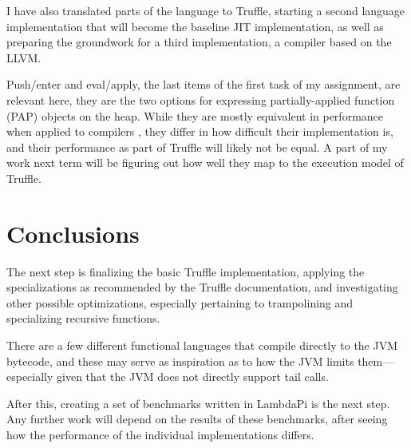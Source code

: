 \documentclass{SPFIT}
\begin{document}
I have also translated parts of the language to Truffle, starting a second
language implementation that will become the baseline JIT implementation, as
well as preparing the groundwork for a third implementation, a compiler based on
the LLVM.

Push/enter and eval/apply, the last items of the first task of my assignment,
are relevant here, they are the two options for expressing partially-applied
function (PAP) objects on the heap. While they are mostly equivalent in
performance when applied to compilers \cite{marlow2004making}, they differ in
how difficult their implementation is, and their performance as part of Truffle
will likely not be equal.  A part of my work next term will be figuring out how
well they map to the execution model of Truffle.

\section{Conclusions}
\label{sec:org57f16e4}
The next step is finalizing the basic Truffle implementation, applying the
specializations as recommended by the Truffle documentation, and investigating
other possible optimizations, especially pertaining to trampolining and
specializing recursive functions.

There are a few different functional languages that compile directly to the JVM
bytecode, and these may serve as inspiration as to how the JVM limits
them---especially given that the JVM does not directly support tail calls.

After this, creating a set of benchmarks written in LambdaPi is the next
step. Any further work will depend on the results of these benchmarks, after
seeing how the performance of the individual implementations differs.



\end{document}
